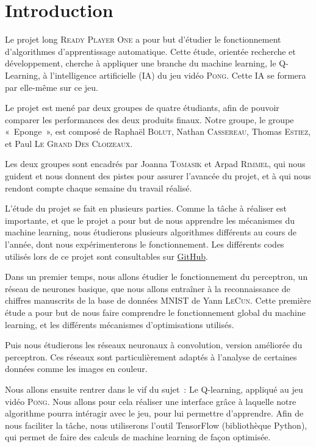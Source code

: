 \section*{Introduction}

Le projet long \textsc{Ready Player One} a pour but d’étudier le fonctionnement d’algorithmes d'apprentissage automatique. Cette étude, 
orientée recherche et développement, cherche à appliquer une branche du machine learning, le Q-Learning, à l’intelligence artificielle (IA)
du jeu vidéo \textsc{Pong}. Cette IA se formera par elle-même sur ce jeu.

Le projet est mené par deux groupes de quatre étudiants, afin de pouvoir comparer les performances des deux produits finaux. 
Notre groupe, le groupe « Eponge », est composé de Raphaël \textsc{Bolut}, Nathan \textsc{Cassereau}, Thomas \textsc{Estiez}, et 
Paul \textsc{Le Grand Des Cloizeaux}. 

Les deux groupes sont encadrés par Joanna \textsc{Tomasik} et Arpad \textsc{Rimmel}, qui nous guident et nous donnent des pistes
pour assurer l'avancée du projet, et à qui nous rendont compte chaque semaine du travail réalisé.

L’étude du projet se fait en plusieurs parties. Comme la tâche à réaliser est importante, et que le projet a pour but 
de nous apprendre les mécanismes du machine learning, nous étudierons plusieurs algorithmes différents au cours de l’année, dont nous expérimenterons
le fonctionnement. 
Les différents codes utilisés lors de ce projet sont consultables sur \href{https://github.com/ready-player-one-supelec}{GitHub}.

Dans un premier temps, nous allons étudier le fonctionnement du perceptron, un réseau de neurones basique, que nous allons entraîner 
à la reconnaissance de chiffres manuscrits de la base de données MNIST de Yann \textsc{LeCun}. Cette première étude a pour but de nous faire 
comprendre le fonctionnement global du machine learning, et les différents mécanismes d’optimisations utilisés.
 
Puis nous étudierons les réseaux neuronaux à convolution, version améliorée du perceptron. Ces réseaux sont particulièrement adaptés à l'analyse
de certaines données comme les images en couleur.

Nous allons ensuite rentrer dans le vif du sujet : Le Q-learning, appliqué au jeu vidéo \textsc{Pong}. Nous allons pour cela réaliser une 
interface grâce à laquelle notre algorithme pourra intéragir avec le jeu, pour lui permettre d’apprendre. Afin de nous faciliter la tâche, nous 
utiliserons l’outil TensorFlow (bibliothèque Python), qui permet de faire des calculs de machine learning de façon optimisée.
